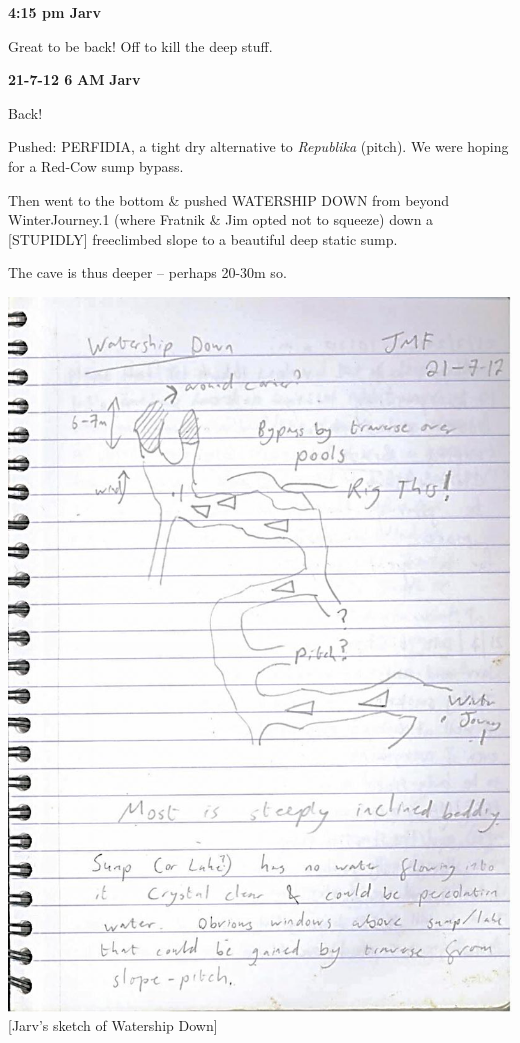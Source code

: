 \textbf{4:15 pm Jarv}

Great to be back! Off to kill the deep stuff.

\textbf{21-7-12 6} \textbf{AM} \textbf{Jarv}

Back!

Pushed: PERFIDIA, a tight dry alternative to \emph{Republika} (pitch).
We were hoping for a Red-Cow sump bypass.

Then went to the bottom \& pushed WATERSHIP DOWN from beyond
WinterJourney.1 (where Fratnik \& Jim opted not to squeeze) down a
{[}STUPIDLY{]} freeclimbed slope to a beautiful deep static sump.

The cave is thus deeper -- perhaps 20-30m so.

\includegraphics{UgLog1012/63.jpeg}\\
{[}Jarv's sketch of Watership Down{]}

